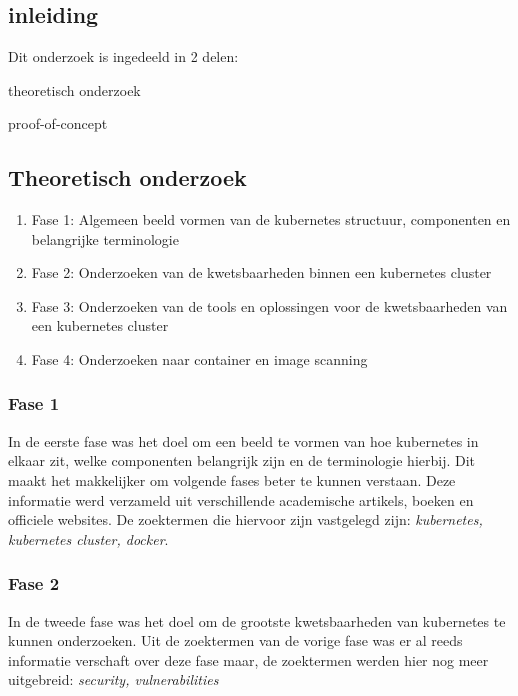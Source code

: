 
\chapter{}%
\label{ch:methodologie}

\section{inleiding}

Dit onderzoek is ingedeeld in 2 delen:
\item theoretisch onderzoek
\item proof-of-concept

\section{Theoretisch onderzoek}

\begin{enumerate}
    \item Fase 1: Algemeen beeld vormen van de kubernetes structuur, componenten en belangrijke terminologie
    \item Fase 2: Onderzoeken van de kwetsbaarheden binnen een kubernetes cluster
    \item Fase 3: Onderzoeken van de tools en oplossingen voor de kwetsbaarheden van een kubernetes cluster
    \item Fase 4: Onderzoeken naar container en image scanning
\end{enumerate}

\subsection{Fase 1}
In de eerste fase was het doel om een beeld te vormen van hoe kubernetes in elkaar zit, welke componenten belangrijk zijn en de terminologie hierbij.
Dit maakt het makkelijker om volgende fases beter te kunnen verstaan. Deze informatie werd verzameld uit verschillende academische artikels, boeken en officiele websites.
De zoektermen die hiervoor zijn vastgelegd zijn: \textit{kubernetes, kubernetes cluster, docker}. 

\subsection{Fase 2}
In de tweede fase was het doel om de grootste kwetsbaarheden van kubernetes te kunnen onderzoeken. 
Uit de zoektermen van de vorige fase was er al reeds informatie verschaft over deze fase maar, de zoektermen werden hier nog meer uitgebreid: \textit{security, vulnerabilities}

